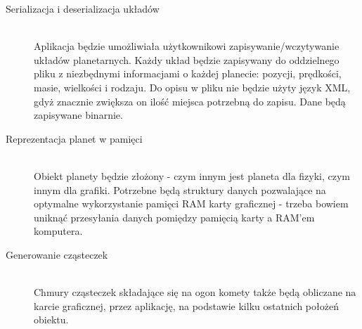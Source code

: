 \begin{description}
	\item[Serializacja i deserializacja układów] \hfill \\
	Aplikacja będzie umożliwiała użytkownikowi zapisywanie/wczytywanie układów planetarnych. Każdy układ będzie zapisywany do oddzielnego pliku z niezbędnymi informacjami o każdej planecie: pozycji, prędkości, masie, wielkości i rodzaju. Do opisu w pliku nie będzie użyty język XML, gdyż znacznie zwiększa on ilość miejsca potrzebną do zapisu. Dane będą zapisywane binarnie.
	\item[Reprezentacja planet w pamięci] \hfill \\
	Obiekt planety będzie złożony - czym innym jest planeta dla fizyki, czym innym dla grafiki. Potrzebne będą struktury danych pozwalające na optymalne wykorzystanie pamięci RAM karty graficznej - trzeba bowiem uniknąć przesyłania danych pomiędzy pamięcią karty a RAM'em komputera.
	\item[Generowanie cząsteczek] \hfill \\
	Chmury cząsteczek składające się na ogon komety także będą obliczane na karcie graficznej, przez aplikację, na podstawie kilku ostatnich położeń obiektu.
\end{description}

